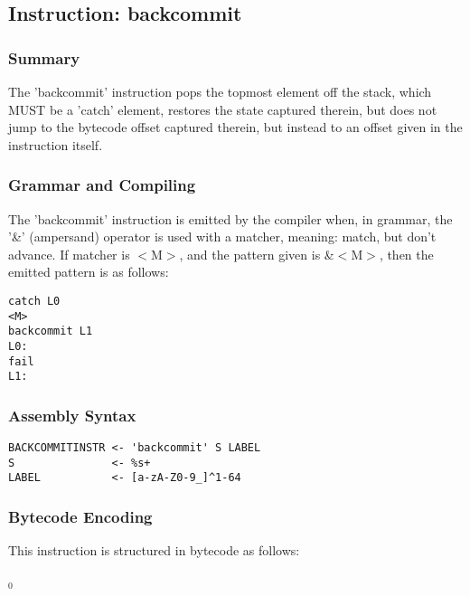 \subsection{Instruction: backcommit}

\subsubsection{Summary}

The 'backcommit' instruction pops the topmost element off the stack,
which MUST be a 'catch' element, restores the state captured therein,
but does not jump to the bytecode offset captured therein, but instead
to an offset given in the instruction itself.

\subsubsection{Grammar and Compiling}

The 'backcommit' instruction is emitted by the compiler when, in grammar,
the '\&' (ampersand) operator is used with a matcher, meaning: match,
but don't advance. If matcher
is $<$M$>$, and the pattern given is \&$<$M$>$, then the emitted pattern
is as follows:

\begin{myquote}
\begin{verbatim}
catch L0
<M>
backcommit L1
L0:
fail
L1:

\end{verbatim}
\end{myquote}

\subsubsection{Assembly Syntax}

\begin{myquote}
\begin{verbatim}
BACKCOMMITINSTR <- 'backcommit' S LABEL
S               <- %s+
LABEL           <- [a-zA-Z0-9_]^1-64

\end{verbatim}
\end{myquote}
\subsubsection{Bytecode Encoding}

This instruction is structured in bytecode as follows:

$_0$\ 

